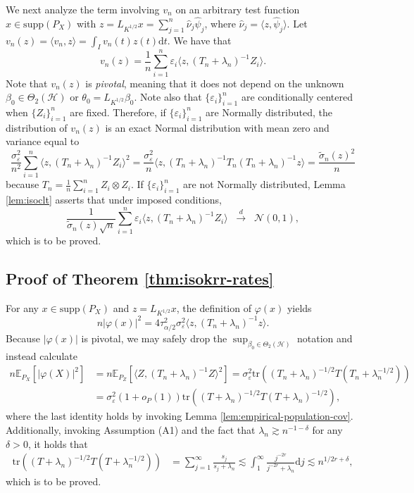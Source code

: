 \documentclass[11pt,a4paper]{article}
\renewcommand{\hat}{\widehat}
\renewcommand{\tilde}{\widetilde}
\newcommand{\tr}{\mathrm{tr}}
\theoremstyle{definition}
\theoremstyle{plain}
\theoremstyle{remark}
\newcommand{\supp}{\mathrm{supp}}
\newcommand{\ud}{\mathrm d}
\newcommand{\mH}{\mathcal H}
\begin{document}
We next analyze the term involving $v_n$ on an arbitrary test function $x\in\supp(P_X)$ with $z=L_{K^{1/2}}x=\sum_{j=1}^n\hat\nu_j\hat\psi_j$, where $\hat\nu_j=\langle z,\hat\psi_j\rangle$.
Let $v_n(z)=\langle v_n,z\rangle = \int_I v_n(t)z(t)\ud t$. We have that
$$
v_n(z) = \frac{1}{n}\sum_{i=1}^n \varepsilon_i \langle z, (T_n+\lambda_n)^{-1}Z_i\rangle.
$$
Note that $v_n(z)$ is \emph{pivotal}, meaning that it does not depend on the unknown $\beta_0\in\Theta_2(\mH)$ or $\theta_0=L_{K^{1/2}}\beta_0$.
Note also that $\{\varepsilon_i\}_{i=1}^n$ are conditionally centered when $\{Z_i\}_{i=1}^n$ are fixed. Therefore, if $\{\varepsilon_i\}_{i=1}^n$ are Normally distributed,
the distribution of $v_n(z)$ is an exact Normal distribution with mean zero and variance equal to
$$
\frac{{\sigma_\varepsilon^2}}{n^2}\sum_{i=1}^n \langle z,(T_n+\lambda_n)^{-1}Z_i\rangle^2 = \frac{{\sigma_\varepsilon^2}}{n}\langle z, (T_n+\lambda_n)^{-1}T_n(T_n+\lambda_n)^{-1}z\rangle = \frac{\tilde\sigma_n(z)^2}{n}
$$
because $T_n=\frac{1}{n}\sum_{i=1}^n Z_i\otimes Z_i$. If $\{\varepsilon_i\}_{i=1}^n$ are not Normally distributed, Lemma \ref{lem:isoclt} asserts that under imposed conditions,
$$
\frac{1}{\tilde\sigma_n(z)\sqrt{n}}\sum_{i=1}^n\varepsilon_i\langle z,(T_n+\lambda_n)^{-1}Z_i\rangle\;\;\overset{d}{\to}\;\; \mathcal N(0,1),
$$
which is to be proved.

\subsection{Proof of Theorem \ref{thm:isokrr-rates}}

For any $x\in\supp(P_X)$ and $z=L_{K^{1/2}}x$, the definition of $\varphi(x)$ yields
$$
n\big|\varphi(x)\big|^2 = 4 \tau^2_{\alpha/2}\sigma_\varepsilon^2\langle z, (T_n+\lambda_n)^{-1}z\rangle.
$$
Because $|\varphi(x)|$ is pivotal, we may safely drop the $\sup_{\beta_0\in\Theta_2(\mH)}$ notation and instead calculate
\begin{align*}
n\mathbb E_{P_X}\left[|\varphi(X)|^2\right] &= n\mathbb E_{P_Z}[\langle Z,(T_n+\lambda_n)^{-1}Z\rangle^2] = \sigma_\varepsilon^2\tr((T_n+\lambda_n)^{-1/2}T(T_n+\lambda_n^{-1/2}))\\
&= \sigma_\varepsilon^2(1+o_P(1))\tr((T+\lambda_n)^{-1/2}T(T+\lambda_n)^{-1/2}),
\end{align*}
where the last identity holds by invoking Lemma \ref{lem:empirical-population-cov}. Additionally, invoking Assumption (A1) and the fact that $\lambda_n\gtrsim n^{-1-\delta}$ for any $\delta>0$, it holds that
\begin{align*}
\tr((T+\lambda_n)^{-1/2}T(T+\lambda_n^{-1/2})) &= \sum_{j=1}^{\infty} \frac{s_j}{s_j+\lambda_n} \lesssim \int_1^{\infty}\frac{j^{-2r}}{j^{-2r}+\lambda_n}\ud j\lesssim n^{1/2r+\delta},
\end{align*}
which is to be proved.
\end{document}
